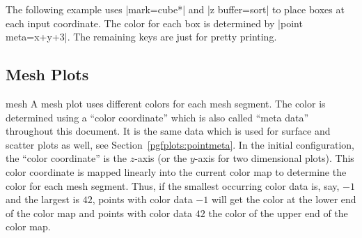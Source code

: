 {The following example uses |mark=cube*| and |z buffer=sort| to place boxes at
each input coordinate. The color for each box is determined by
|point meta={x+y+3}|. The remaining keys are just for pretty printing.
%
\pgfplotsexpensiveexample
\begin{codeexample}[]
\end{codeexample}


\subsection{Mesh Plots}
\label{sec:2d:mesh}

\begin{plottype}[/pgfplots]{mesh}
    A mesh plot uses different colors for each mesh segment. The color is
    determined using a ``color coordinate'' which is also called ``meta data''
    throughout this document. It is the same data which is used for surface and
    scatter plots as well, see Section~\ref{pgfplots:pointmeta}. In the initial
    configuration, the ``color coordinate'' is the $z$-axis (or the $y$-axis
    for two dimensional plots). This color coordinate is mapped linearly into
    the current color map to determine the color for each mesh segment. Thus,
    if the smallest occurring color data is, say, $-1$ and the largest is $42$,
    points with color data $-1$ will get the color at the lower end of the
    color map and points with color data $42$ the color of the upper end of the
    color map.


\end{plottype}}
